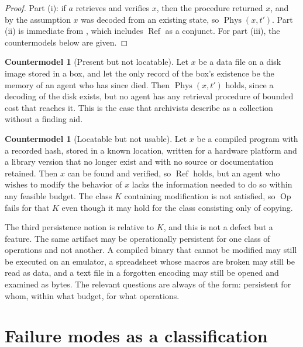 \documentclass[11pt,twoside,openright]{book}
\theoremstyle{plain}
\theoremstyle{definition}
\newtheorem{countermodel}[theorem]{Countermodel}
\theoremstyle{remark}
\newcommand{\Phys}{\operatorname{Phys}}
\newcommand{\Refp}{\operatorname{Ref}}
\newcommand{\Oper}{\operatorname{Op}}
\begin{document}
\begin{proof}
Part (i): if $a$ retrieves and verifies $x$, then the procedure returned $x$, and by the assumption $x$ was decoded from an existing state, so $\Phys(x,t')$. Part (ii) is immediate from , which includes $\Refp$ as a conjunct. For part (iii), the countermodels below are given.
\end{proof}

\begin{countermodel}[Present but not locatable]\label{cm:lost}
Let $x$ be a data file on a disk image stored in a box, and let the only record of the box's existence be the memory of an agent who has since died. Then $\Phys(x,t')$ holds, since a decoding of the disk exists, but no agent has any retrieval procedure of bounded cost that reaches it. This is the case that archivists describe as a collection without a finding aid.
\end{countermodel}

\begin{countermodel}[Locatable but not usable]\label{cm:opaque}
Let $x$ be a compiled program with a recorded hash, stored in a known location, written for a hardware platform and a library version that no longer exist and with no source or documentation retained. Then $x$ can be found and verified, so $\Refp$ holds, but an agent who wishes to modify the behavior of $x$ lacks the information needed to do so within any feasible budget. The class $K$ containing modification is not satisfied, so $\Oper$ fails for that $K$ even though it may hold for the class consisting only of copying.
\end{countermodel}

The third persistence notion is relative to $K$, and this is not a defect but a feature. The same artifact may be operationally persistent for one class of operations and not another. A compiled binary that cannot be modified may still be executed on an emulator, a spreadsheet whose macros are broken may still be read as data, and a text file in a forgotten encoding may still be opened and examined as bytes. The relevant questions are always of the form: persistent for whom, within what budget, for what operations.

\section{Failure modes as a classification}
\end{document}
